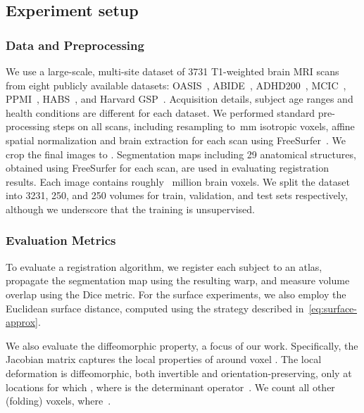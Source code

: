 \documentclass{article}
\newcommand{\citep}{\cite}
\begin{document}
\subsection{Experiment setup}

\subsubsection{Data and Preprocessing}
We use a large-scale, multi-site dataset of 3731 T1-weighted brain MRI scans from eight publicly available datasets: OASIS~\citep{marcus2007open}, ABIDE~\citep{di2014autism}, ADHD200~\citep{milham2012adhd}, MCIC~\citep{gollub2013mcic}, PPMI~\citep{marek2011parkinson}, HABS~\citep{dagley2015harvard}, and Harvard GSP~\citep{holmes2015brain}. Acquisition details, subject age ranges and health conditions are different for each dataset. We performed standard pre-processing steps on all scans, including resampling to~mm isotropic voxels, affine spatial normalization and brain extraction for each scan using FreeSurfer~\citep{fischl2012}. We crop the final images to . Segmentation maps including 29 anatomical structures, obtained using FreeSurfer for each scan, are used in evaluating registration results.  Each image contains roughly~ million brain voxels. We split the dataset into 3231, 250, and 250 volumes for train, validation, and test sets respectively, although we underscore that the training is unsupervised.

\subsubsection{Evaluation Metrics}
To evaluate a registration algorithm, we register each subject to an atlas, propagate the segmentation map using the resulting warp, and measure volume overlap using the Dice metric. For the surface experiments, we also employ the Euclidean surface distance, computed using the strategy described in~\eqref{eq:surface-approx}. 

We also evaluate the diffeomorphic property, a focus of our work. Specifically, the Jacobian matrix \mbox{} captures the local properties of  around voxel . The local deformation is diffeomorphic, both invertible and orientation-preserving, only at locations for which , where  is the determinant operator~\citep{ashburner2007}.
We count all other (folding) voxels, where~.
\end{document}
